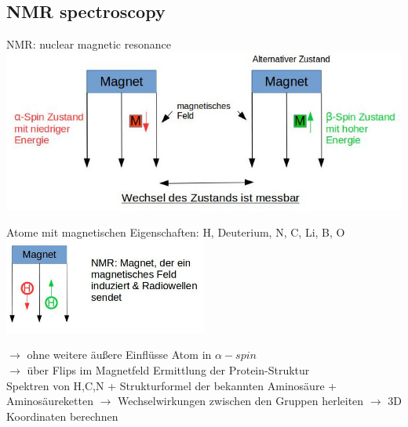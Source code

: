 \subsection{NMR spectroscopy}
NMR: nuclear magnetic resonance\\
\includegraphics[width=1\textwidth]{lectures/160603/pix/3.jpg}

Atome mit magnetischen Eigenschaften: H, Deuterium, N, C, Li, B, O\\
\includegraphics[width=0.5\textwidth]{lectures/160603/pix/4.jpg}

$\rightarrow$ ohne weitere äußere Einflüsse Atom in $\alpha-spin$\\
$\rightarrow$ über Flips im Magnetfeld Ermittlung der Protein-Struktur\\

Spektren von H,C,N + Strukturformel der bekannten Aminosäure + Aminosäureketten $\rightarrow$ Wechselwirkungen zwischen den Gruppen herleiten $\rightarrow$ 3D Koordinaten berechnen
